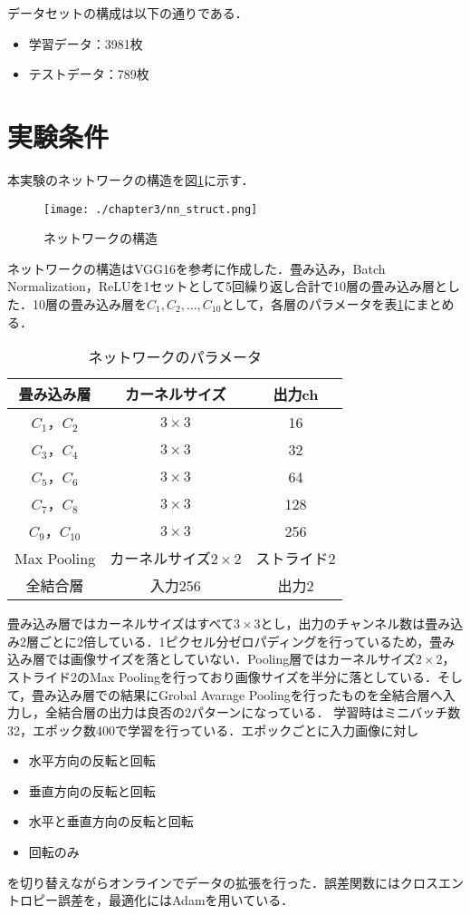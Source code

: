 データセットの構成は以下の通りである．
\begin{itemize}
  \item 学習データ：3981枚
  \item テストデータ：789枚
\end{itemize}

\section{実験条件}
本実験のネットワークの構造を図\ref{fig_nnst}に示す．
\begin{figure}[htbp]
  \begin{center}
    \texttt{[image: ./chapter3/nn\_struct.png]}
    \caption{ネットワークの構造}
    \label{fig_nnst}
  \end{center}
\end{figure}

ネットワークの構造はVGG16\cite{simonyan2015deep}を参考に作成した．畳み込み，Batch Normalization，ReLUを1セットとして5回繰り返し合計で10層の畳み込み層とした．10層の畳み込み層を$C_1, C_2,  \ldots , C_{10}$として，各層のパラメータを表\ref{table_network_parameter}にまとめる．
\begin{table}[htbp]
  \caption{ネットワークのパラメータ}
  \label{table_network_parameter}
  \centering
  \begin{tabular}{ccc}
    \hline
    畳み込み層  & カーネルサイズ & 出力ch \\
    \hline \hline
    $C_1$，$C_2$ & $3\times 3$ & 16\\
    $C_3$，$C_4$ & $3\times 3$ & 32\\
    $C_5$，$C_6$ & $3\times 3$ & 64\\
    $C_7$，$C_8$ & $3\times 3$ & 128\\
    $C_9$，$C_{10}$ & $3\times 3$ & 256\\
    \hline
    Max Pooling & カーネルサイズ$2\times 2$ & ストライド2\\
    全結合層 & 入力256 & 出力2\\
    \hline
  \end{tabular}
\end{table}
畳み込み層ではカーネルサイズはすべて$3\times 3$とし，出力のチャンネル数は畳み込み2層ごとに2倍している．1ピクセル分ゼロパディングを行っているため，畳み込み層では画像サイズを落としていない．Pooling層ではカーネルサイズ$2\times 2$，ストライド2のMax Poolingを行っており画像サイズを半分に落としている．そして，畳み込み層での結果にGrobal Avarage Poolingを行ったものを全結合層へ入力し，全結合層の出力は良否の2パターンになっている．
学習時はミニバッチ数32，エポック数400で学習を行っている．エポックごとに入力画像に対し
\begin{itemize}
  \item 水平方向の反転と回転
  \item 垂直方向の反転と回転
  \item 水平と垂直方向の反転と回転
  \item 回転のみ
\end{itemize}
を切り替えながらオンラインでデータの拡張を行った．誤差関数にはクロスエントロピー誤差を，最適化にはAdamを用いている．

